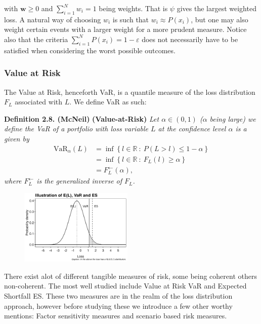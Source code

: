 \documentclass[a4paper,12pt,openany]{book}
\begin{document}
with \(\mathbf{w}\ge 0\) and \(\sum_{i=1}^Nw_i=1\) being weights. That is \(\psi\) gives the largest weighted loss. A natural way of choosing \(w_i\) is such that \(w_i\approx P(x_i)\), but one may also weight certain events with a larger weight for a more prudent measure. Notice also that the criteria \(\sum_{i=1}^N P(x_i)=1-\varepsilon\) does not necessarily have to be satisfied when considering the worst possible outcomes.

\hypertarget{value-at-risk}{%
\subsubsection{Value at Risk}\label{value-at-risk}}

The Value at Risk, henceforth VaR, is a quantile measure of the loss distribution \(F_L\) associated with \(L\). We define VaR as such:

\textbf{Definition 2.8. (McNeil)} \textbf{(Value-at-Risk)} \emph{Let \(\alpha\in (0,1)\) (\(\alpha\) being large) we define the VaR of a portfolio with loss variable \(L\) at the confidence level \(\alpha\) is a given by}
\begin{align*}
\text{VaR}_\alpha(L)&=\inf\left\{ l\in\mathbb{R}\ :\ P(L>l)\le 1-\alpha \right\}\\
&=\inf\left\{ l\in\mathbb{R}\ :\ F_L(l)\ge \alpha \right\}\\
&=F^{\leftarrow}_L(\alpha),
\end{align*}
\emph{where \(F^{\leftarrow}_L\) is the generalized inverse of \(F_L\).}

\begin{figure}
  \begin{center}
    \includegraphics[width=0.48\textwidth]{figures/VaR_ES.png}
  \end{center}
\end{figure}

There exist alot of different tangible measures of risk, some being coherent others non-coherent. The most well studied include Value at Risk VaR and Expected Shortfall ES. These two measures are in the realm of the loss distribution approach, however before studying these we introduce a few other worthy mentions: Factor sensitivity measures and scenario based risk measures.
\end{document}

